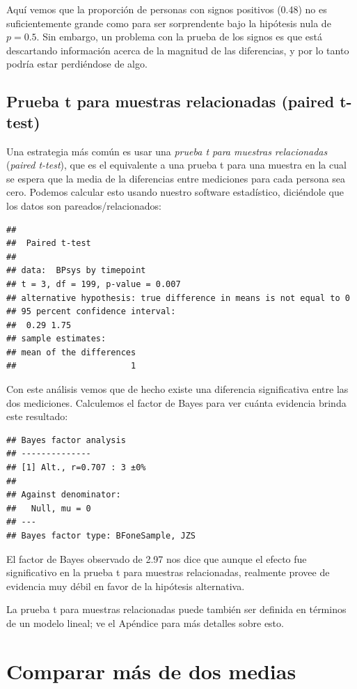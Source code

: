 \documentclass[
  12pt,
]{book}
\begin{document}
Aquí vemos que la proporción de personas con signos positivos (0.48) no es suficientemente grande como para ser sorprendente bajo la hipótesis nula de \(p=0.5\). Sin embargo, un problema con la prueba de los signos es que está descartando información acerca de la magnitud de las diferencias, y por lo tanto podría estar perdiéndose de algo.

\hypertarget{prueba-t-para-muestras-relacionadas-paired-t-test}{%
\subsection{Prueba t para muestras relacionadas (paired t-test)}\label{prueba-t-para-muestras-relacionadas-paired-t-test}}

Una estrategia más común es usar una \emph{prueba t para muestras relacionadas} (\emph{paired t-test}), que es el equivalente a una prueba t para una muestra en la cual se espera que la media de la diferencias entre mediciones para cada persona sea cero. Podemos calcular esto usando nuestro software estadístico, diciéndole que los datos son pareados/relacionados:

\begin{verbatim}
## 
##  Paired t-test
## 
## data:  BPsys by timepoint
## t = 3, df = 199, p-value = 0.007
## alternative hypothesis: true difference in means is not equal to 0
## 95 percent confidence interval:
##  0.29 1.75
## sample estimates:
## mean of the differences 
##                       1
\end{verbatim}

Con este análisis vemos que de hecho existe una diferencia significativa entre las dos mediciones. Calculemos el factor de Bayes para ver cuánta evidencia brinda este resultado:

\begin{verbatim}
## Bayes factor analysis
## --------------
## [1] Alt., r=0.707 : 3 ±0%
## 
## Against denominator:
##   Null, mu = 0 
## ---
## Bayes factor type: BFoneSample, JZS
\end{verbatim}

El factor de Bayes observado de 2.97 nos dice que aunque el efecto fue significativo en la prueba t para muestras relacionadas, realmente provee de evidencia muy débil en favor de la hipótesis alternativa.

La prueba t para muestras relacionadas puede también ser definida en términos de un modelo lineal; ve el Apéndice para más detalles sobre esto.

\hypertarget{comparar-muxe1s-de-dos-medias}{%
\section{Comparar más de dos medias}\label{comparar-muxe1s-de-dos-medias}}
\end{document}
